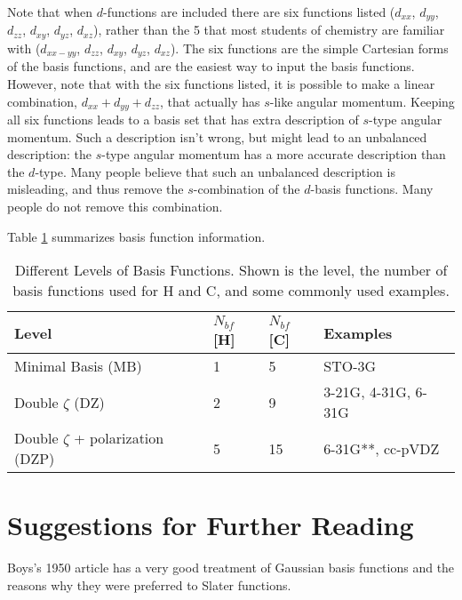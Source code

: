 Note that when $d$-functions are included there are six functions listed
($d_{xx}$, $d_{yy}$, $d_{zz}$, $d_{xy}$, $d_{yz}$, $d_{xz}$), rather
than the 5 that most students of chemistry are familiar with
($d_{xx-yy}$, $d_{zz}$, $d_{xy}$, $d_{yz}$, $d_{xz}$). The six
functions are the simple Cartesian forms of the basis functions, and
are the easiest way to input the basis functions. However, note that
with the six functions listed, it is possible to make a linear
combination, $d_{xx} + d_{yy} + d_{zz}$, that actually has $s$-like
angular momentum. Keeping all six functions leads to a basis set that
has extra description of $s$-type angular momentum. Such a description
isn't wrong, but might lead to an unbalanced description: the $s$-type
angular momentum has a more accurate description than the
$d$-type. Many people believe that such an unbalanced description is
misleading, and thus remove the $s$-combination of the $d$-basis
functions. Many people do not remove this combination. 

Table \ref{table:bsets} summarizes basis function information.

\begin{table}
\caption{Different Levels of Basis Functions. Shown is the level, the
number of basis functions used for H and C, and some commonly used
examples.}
\label{table:bsets}
\begin{tabular}{llll}\hline\hline
Level & $N_{bf}$[H] & $N_{bf}$[C] & Examples \\  \hline
Minimal Basis (MB) & 1 & 5 & STO-3G \\
Double $\zeta$ (DZ) & 2 & 9 & 3-21G, 4-31G, 6-31G \\
Double $\zeta$ + polarization (DZP) & 5 & 15 & 6-31G**, cc-pVDZ\\ \hline\hline
\end{tabular}
\end{table}

\section{Suggestions for Further Reading}
Boys's 1950 article \cite{Boys50} has a very good treatment of
Gaussian basis functions and the reasons why they were preferred to
Slater functions. 